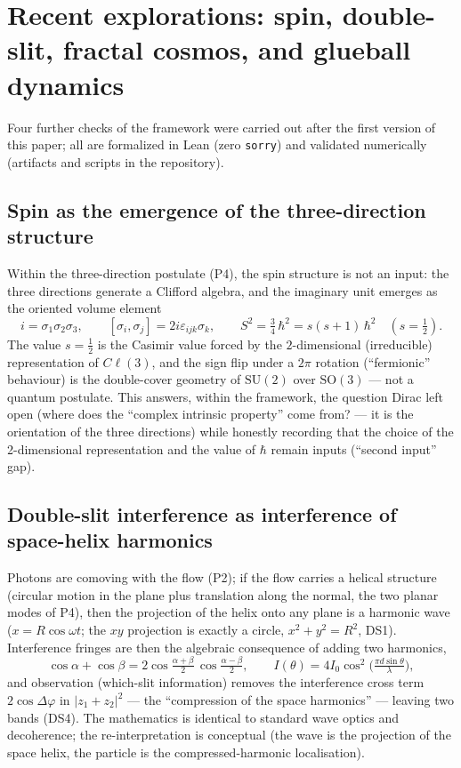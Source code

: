 \documentclass[aps,prd,preprint,superscriptaddress,amsmath,amssymb]{revtex4-2}
\begin{document}
\section{Recent explorations: spin, double-slit, fractal cosmos, and glueball dynamics}\label{sec:explorations}

Four further checks of the framework were carried out after the first
version of this paper; all are formalized in Lean (zero \texttt{sorry})
and validated numerically (artifacts and scripts in the repository).

\subsection{Spin as the emergence of the three-direction structure}

Within the three-direction postulate (P4), the spin structure is not an
input: the three directions generate a Clifford algebra, and the imaginary
unit emerges as the oriented volume element
\begin{equation}
i = \sigma_1\sigma_2\sigma_3 , \qquad
[\sigma_i,\sigma_j] = 2i\varepsilon_{ijk}\sigma_k , \qquad
S^2 = \tfrac34\,\hbar^2 = s(s{+}1)\,\hbar^2 \quad (s=\tfrac12) .
\end{equation}
The value $s=\tfrac12$ is the Casimir value forced by the $2$-dimensional
(irreducible) representation of $C\ell(3)$, and the sign flip under a
$2\pi$ rotation (``fermionic'' behaviour) is the double-cover geometry of
$\mathrm{SU}(2)$ over $\mathrm{SO}(3)$ --- not a quantum postulate.  This
answers, within the framework, the question Dirac left open (where does the
``complex intrinsic property'' come from? --- it is the orientation of the
three directions) while honestly recording that the choice of the
2-dimensional representation and the value of $\hbar$ remain inputs
(``second input'' gap).

\subsection{Double-slit interference as interference of space-helix harmonics}

Photons are comoving with the flow (P2); if the flow carries a helical
structure (circular motion in the plane plus translation along the normal,
the two planar modes of P4), then the projection of the helix onto any
plane is a harmonic wave ($x=R\cos\omega t$; the $xy$ projection is exactly
a circle, $x^2+y^2=R^2$, DS1).  Interference fringes are then the algebraic
consequence of adding two harmonics,
\begin{equation}
\cos\alpha+\cos\beta=2\cos\!\tfrac{\alpha+\beta}{2}\,\cos\!\tfrac{\alpha-\beta}{2},
\qquad I(\theta)=4I_0\cos^2\!\big(\tfrac{\pi d\sin\theta}{\lambda}\big),
\end{equation}
and observation (which-slit information) removes the interference cross
term $2\cos\Delta\varphi$ in $|z_1+z_2|^2$ --- the ``compression of the
space harmonics'' --- leaving two bands (DS4).  The mathematics is
identical to standard wave optics and decoherence; the re-interpretation
is conceptual (the wave is the projection of the space helix, the particle
is the compressed-harmonic localisation).
\end{document}
